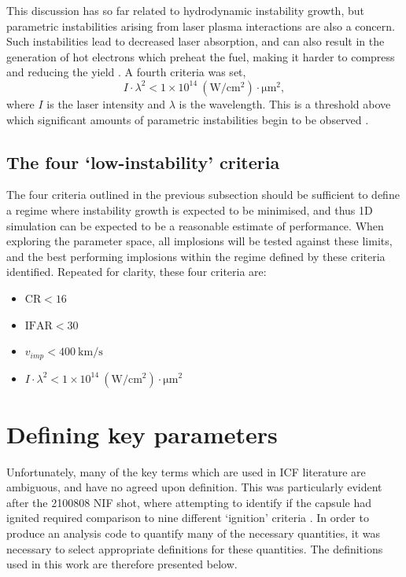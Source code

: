 This discussion has so far related to hydrodynamic instability growth, but parametric instabilities arising from laser plasma interactions are also a concern. Such instabilities lead to decreased laser absorption, and can also result in the generation of hot electrons which preheat the fuel, making it harder to compress and reducing the yield \cite{Rosenberg2018, Yaakobi2000}. A fourth criteria was set,
\begin{equation} I \cdot \lambda^2 < 1 \times 10^{14} \: (\unit{\watt\per\centi\meter\squared}) \cdot \unit{\micro\meter\squared}, \end{equation}
where $I$ is the laser intensity and $\lambda$ is the wavelength. This is a threshold above which significant amounts of parametric instabilities begin to be observed \cite{Montgomery2016}.

\subsection{The four `low-instability' criteria}
The four criteria outlined in the previous subsection should be sufficient to define a regime where instability growth is expected to be minimised, and thus 1D simulation can be expected to be a reasonable estimate of performance. When exploring the parameter space, all implosions will be tested against these limits, and the best performing implosions within the regime defined by these criteria identified. Repeated for clarity, these four criteria are:
\begin{itemize}
    \item $\textrm{CR} < 16$
    \item $\textrm{IFAR} < 30$
    \item $v_{imp} < 400 \: \unit{\kilo\meter\per\second}$
    \item $I \cdot \lambda^2 < 1 \times 10^{14} \: (\unit{\watt\per\centi\meter\squared}) \cdot \unit{\micro\meter\squared}$
\end{itemize}



\section{Defining key parameters}

Unfortunately, many of the key terms which are used in ICF literature are ambiguous, and have no agreed upon definition. This was particularly evident after the 2100808 NIF shot, where attempting to identify if the capsule had ignited required comparison to nine different `ignition' criteria \cite{Abu-Shawareb2022}. In order to produce an analysis code to quantify many of the necessary quantities, it was necessary to select appropriate definitions for these quantities. The definitions used in this work are therefore presented below.


